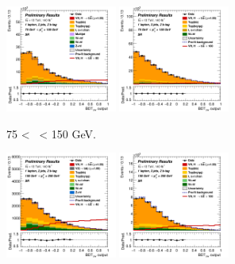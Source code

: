 \begin{figure}[h!]
    \centering
    \begin{subfigure}[b]{\textwidth}
        \centering
        \includegraphics[width=0.40\textwidth]{Images/VH/Own_fit/postfit_VHbb/Region_distmva_BMax150_BMin75_DSR_J2_TTypebb_T2_L1_Y6051_GlobalFit_conditionnal_mu1.png}
        \includegraphics[width=0.40\textwidth]{Images/VH/Own_fit/postfit_VHbb/Region_distmva_BMax150_BMin75_DSR_J3_TTypebb_T2_L1_Y6051_GlobalFit_conditionnal_mu1.png}
        \caption{75 < \ptv\ < 150 GeV.}
        \label{fig:plots_VHbb_1L_75_SR}
    \end{subfigure}
    \begin{subfigure}[b]{\textwidth}
        \centering
        \includegraphics[width=0.40\textwidth]{Images/VH/Own_fit/postfit_VHbb/Region_distmva_BMax250_BMin150_DSR_J2_TTypebb_T2_L1_Y6051_GlobalFit_conditionnal_mu1.png}
        \includegraphics[width=0.40\textwidth]{Images/VH/Own_fit/postfit_VHbb/Region_distmva_BMax250_BMin150_DSR_J3_TTypebb_T2_L1_Y6051_GlobalFit_conditionnal_mu1.png}

\end{subfigure}
\end{figure}
